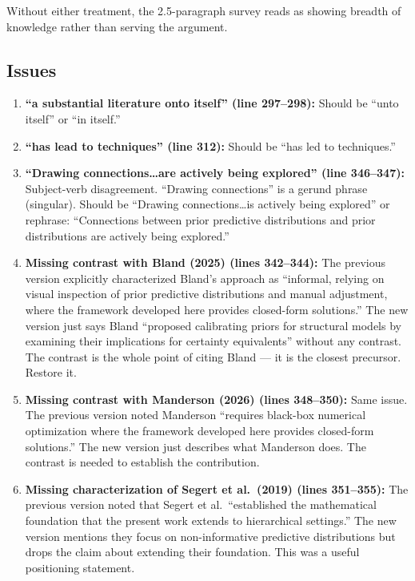 \documentclass[12pt,a4paper]{article}
\begin{document}
Without either treatment, the 2.5-paragraph survey reads as showing breadth
of knowledge rather than serving the argument.

\subsection{Issues}

\begin{enumerate}[leftmargin=1.5em]
  \item \textbf{``a substantial literature onto itself'' (line 297--298):}
    Should be ``unto itself'' or ``in itself.''

  \item \textbf{``has lead to techniques'' (line 312):} Should be ``has led
    to techniques.''

  \item \textbf{``Drawing connections\ldots are actively being explored''
    (line 346--347):} Subject-verb disagreement. ``Drawing connections'' is a
    gerund phrase (singular). Should be ``Drawing connections\ldots is actively
    being explored'' or rephrase: ``Connections between prior predictive
    distributions and prior distributions are actively being explored.''

  \item \textbf{Missing contrast with Bland (2025) (lines 342--344):} The
    previous version explicitly characterized Bland's approach as ``informal,
    relying on visual inspection of prior predictive distributions and manual
    adjustment, where the framework developed here provides closed-form
    solutions.'' The new version just says Bland ``proposed calibrating priors
    for structural models by examining their implications for certainty
    equivalents'' without any contrast. The contrast is the whole point of
    citing Bland --- it is the closest precursor. Restore it.

  \item \textbf{Missing contrast with Manderson (2026) (lines 348--350):}
    Same issue. The previous version noted Manderson ``requires black-box
    numerical optimization where the framework developed here provides
    closed-form solutions.'' The new version just describes what Manderson
    does. The contrast is needed to establish the contribution.

  \item \textbf{Missing characterization of Segert et al.\ (2019) (lines
    351--355):} The previous version noted that Segert et al.\ ``established
    the mathematical foundation that the present work extends to hierarchical
    settings.'' The new version mentions they focus on non-informative
    predictive distributions but drops the claim about extending their
    foundation. This was a useful positioning statement.


\end{enumerate}
\end{document}
